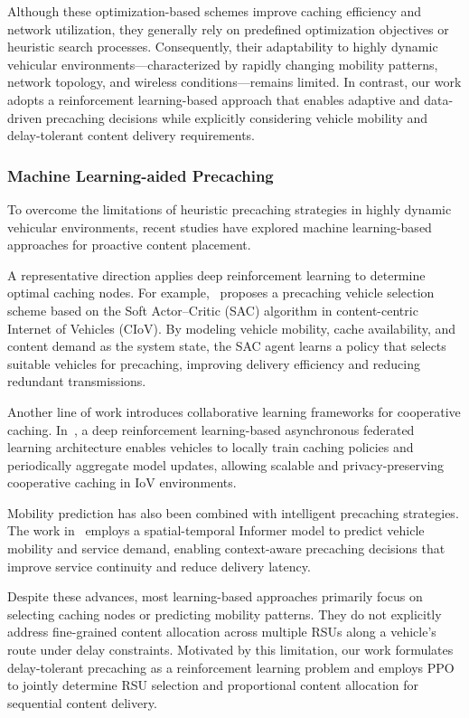 Although these optimization-based schemes improve caching efficiency and network utilization, they generally rely on predefined optimization objectives or heuristic search processes. Consequently, their adaptability to highly dynamic vehicular environments—characterized by rapidly changing mobility patterns, network topology, and wireless conditions—remains limited. In contrast, our work adopts a reinforcement learning-based approach that enables adaptive and data-driven precaching decisions while explicitly considering vehicle mobility and delay-tolerant content delivery requirements.


\subsubsection{Machine Learning-aided Precaching}
\label{subsubsec:rw_learning_precaching}

To overcome the limitations of heuristic precaching strategies in highly dynamic vehicular environments, recent studies have explored machine learning-based approaches for proactive content placement.

A representative direction applies deep reinforcement learning to determine optimal caching nodes. 
For example,~\cite{SAC_precaching} proposes a precaching vehicle selection scheme based on the Soft Actor--Critic (SAC) algorithm in content-centric Internet of Vehicles (CIoV). 
By modeling vehicle mobility, cache availability, and content demand as the system state, the SAC agent learns a policy that selects suitable vehicles for precaching, improving delivery efficiency and reducing redundant transmissions.

Another line of work introduces collaborative learning frameworks for cooperative caching. 
In~\cite{DRL_FL_caching}, a deep reinforcement learning-based asynchronous federated learning architecture enables vehicles to locally train caching policies and periodically aggregate model updates, allowing scalable and privacy-preserving cooperative caching in IoV environments.

Mobility prediction has also been combined with intelligent precaching strategies. 
The work in~\cite{Informer_precaching} employs a spatial-temporal Informer model to predict vehicle mobility and service demand, enabling context-aware precaching decisions that improve service continuity and reduce delivery latency.

Despite these advances, most learning-based approaches primarily focus on selecting caching nodes or predicting mobility patterns. 
They do not explicitly address fine-grained content allocation across multiple RSUs along a vehicle's route under delay constraints. 
Motivated by this limitation, our work formulates delay-tolerant precaching as a reinforcement learning problem and employs PPO to jointly determine RSU selection and proportional content allocation for sequential content delivery.









